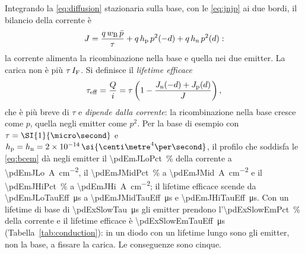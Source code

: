 \documentclass[10pt,a4paper]{scrartcl}
\let\newcommand\pdvaluedefine
\newcommand{\IF}{I_\mathrm{F}}
\newcommand{\wB}{w_\mathrm{B}}
\newcommand{\Jn}{J_\mathrm{n}}
\newcommand{\Jp}{J_\mathrm{p}}
\begin{document}
Integrando la \eqref{eq:diffusion} stazionaria sulla base, con le \eqref{eq:jnjp} ai due bordi, il bilancio della corrente è
\begin{equation}
J = \frac{q\,\wB\,\bar p}{\tau} + q\,h_\mathrm{p}\,p^2(-d) + q\,h_\mathrm{n}\,p^2(d) :
\label{eq:emitterbal}
\end{equation}
la corrente alimenta la ricombinazione nella base e quella nei due emitter. La carica non è più $\tau\,\IF$. Si definisce il \emph{lifetime efficace}
\begin{equation}
\tau_\mathrm{eff} = \frac{Q}{i} = \tau\left(1 - \frac{\Jn(-d) + \Jp(d)}{J}\right) ,
\label{eq:taueff}
\end{equation}
che è più breve di $\tau$ e \emph{dipende dalla corrente}: la ricombinazione nella base cresce come $p$, quella negli emitter come $p^2$. Per la base di esempio con $\tau = \SI{\pdExMidTau}{\micro\second}$ e $h_\mathrm{p} = h_\mathrm{n} = \pdHem\,\si{\centi\metre^4\per\second}$, il profilo che soddisfa le \eqref{eq:bcem} dà negli emitter il \SI{\pdEmJLoPct}{\percent} della corrente a \SI{\pdEmJLo}{\ampere\per\centi\metre\squared}, il \SI{\pdEmJMidPct}{\percent} a \SI{\pdEmJMid}{\ampere\per\centi\metre\squared} e il \SI{\pdEmJHiPct}{\percent} a \SI{\pdEmJHi}{\ampere\per\centi\metre\squared}; il lifetime efficace scende da \SI{\pdEmJLoTauEff}{\micro\second} a \SI{\pdEmJMidTauEff}{\micro\second} e \SI{\pdEmJHiTauEff}{\micro\second}. Con un lifetime di base di \SI{\pdExSlowTau}{\micro\second} gli emitter prendono l'\SI{\pdExSlowEmPct}{\percent} della corrente e il lifetime efficace è \SI{\pdExSlowEmTauEff}{\micro\second} (Tabella~\ref{tab:conduction}): in un diodo con un lifetime lungo sono gli emitter, non la base, a fissare la carica. Le conseguenze sono cinque.
\end{document}
